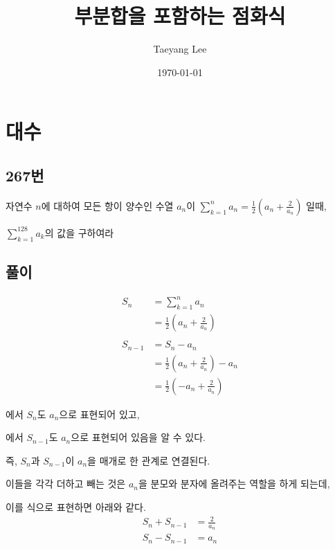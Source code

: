 \documentclass[a4paper,12pt]{article}
\title{부분합을 포함하는 점화식}
\author{Taeyang Lee}
\date{\today}
\begin{document}
\maketitle
\tableofcontents  %
\newpage

\section{대수}
\subsection{267번}
\setlength{\parindent}{20pt}
    자연수 $n$에 대하여 모든 항이 양수인 수열 ${a_n}$이 
    $\sum_{k=1}^n {a_n} = \frac{1}{2} \left( {a_n} + \frac{2}{a_n} \right) $
    일때, 

    $\sum _ {k=1} ^{128} a_k$의 값을 구하여라

\subsection{풀이}

\begin{align}
    S_n &= \sum_{k=1}^n a_n \nonumber \\
        &= \frac{1}{2}\left(a_n + \frac{2}{a_n}\right)  \label{eq:S_n}\\[6pt]
    \nonumber \\
    S_{n-1} &= S_n - a_n \nonumber \\
            &= \frac{1}{2}\left(a_n + \frac{2}{a_n}\right) - a_n \nonumber \\
            &= \frac{1}{2}\left(-a_n + \frac{2}{a_n}\right) \label{eq:S_n-1}
\end{align}


에서 $S_n$도 $a_n$으로 표현되어 있고,

에서 $S_{n-1}$도 $a_n$으로 표현되어 있음을 알 수 있다.

즉, $S_n$과 $S_{n-1}$이 $a_n$을 매개로 한 관계로 연결된다.

이들을 각각 더하고 빼는 것은 $a_n$을 분모와 분자에 올려주는 역할을 하게 되는데,

이를 식으로 표현하면 아래와 같다.
\begin{align}
    S_n + S_{n-1} &= \frac{2}{a_n} \label{eq:sum}\\
    S_n - S_{n-1} &= a_n \label{eq:diff}
\end{align}
\end{document}
